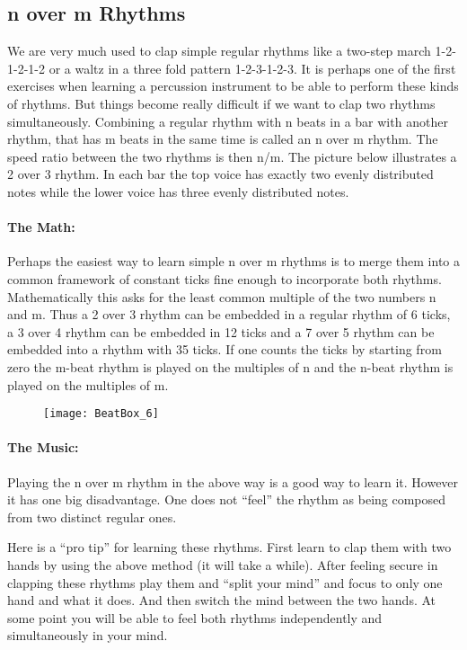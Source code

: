 \subsection{n over m Rhythms}
We are very much used to clap simple regular rhythms like a two-step march 1-2-1-2-1-2 or a waltz in a three fold pattern 1-2-3-1-2-3. It is perhaps one of the first exercises when learning a percussion instrument to be able to perform these kinds of rhythms. But things become really difficult if we want to clap two rhythms simultaneously. Combining a regular rhythm with n beats in a bar with another rhythm, that has m beats in the same time is called an n over m rhythm. The speed ratio between the two rhythms is then n/m. The picture below illustrates a 2 over 3 rhythm. In each bar the top voice has exactly two evenly distributed notes while the lower voice has three evenly distributed notes.

\paragraph{The Math:}
Perhaps the easiest way to learn simple n over m rhythms is to merge them into a common framework of constant ticks fine enough to incorporate both rhythms. Mathematically this asks for the least common multiple of the two numbers n and m. Thus a 2 over 3 rhythm can be embedded in a regular rhythm of 6 ticks, a 3 over 4 rhythm can be embedded in 12 ticks and a 7 over 5 rhythm can be embedded into a rhythm with 35 ticks. If one counts the ticks by starting from zero the  m-beat rhythm is played on the multiples of n and the n-beat rhythm is played on the multiples of m.

\begin{figure}[h]
\centering
\texttt{[image: BeatBox\_6]}
\end{figure}

\paragraph{The Music:} Playing the n over m rhythm in the above way is a good way to learn it. However it has one big disadvantage. One does not ``feel'' the rhythm as being composed from two distinct regular ones.

Here is a ``pro tip'' for learning these rhythms. First learn to clap them with two hands by using the above method (it will take a while). After feeling secure in clapping these rhythms play them and ``split your mind'' and focus to only one hand and what it does. And then switch the mind between the two hands. At some point you will be able to feel both rhythms independently and simultaneously in your mind.

